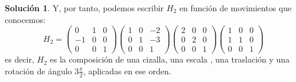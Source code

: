 \documentclass[a4paper, 11pt]{article}
\theoremstyle{definition}
\newtheorem*{solucion}{Solución}
\theoremstyle{theorem}
\begin{document}
\begin{solucion}
      Y, por tanto, podemos escribir $H_2$ en función de movimientos que conocemos:
      \[
      H_2 =
      \left(\begin{array}{ccc}
          0 & 1 & 0 \\
          -1 & 0 & 0 \\
          0 & 0 & 1
      \end{array}
      \right)
      \left(
      \begin{array}{ccc}
          1 & 0 & -2 \\
          0 & 1 & -3 \\
          0 & 0 & 1
      \end{array}
      \right)
      \left(
      \begin{array}{ccc}
          2 & 0 & 0 \\
          0 & 2 & 0 \\
          0 & 0 & 1
      \end{array}
      \right)
      \left(
      \begin{array}{ccc}
          1 & 0 & 0 \\
          1 & 1 & 0 \\
          0 & 0 & 1
      \end{array}
      \right)
      \]
      es decir, $H_2$ es la composición de una cizalla, una escala , una traslación y una rotación de ángulo $3\frac{\pi}{2}$, aplicadas en ese orden.


\end{solucion}
\end{document}

